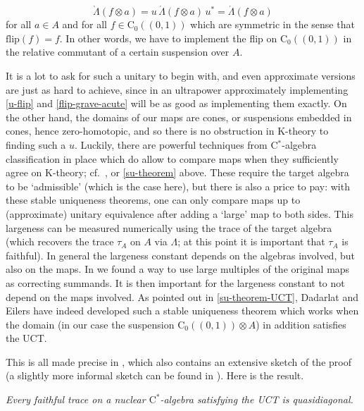 \documentclass{amsart}
\newcounter{number}[section]
\newenvironment{nummer}{\refstepcounter{number}{\noindent\arabic{section}.\arabic{number}}}{}
\newcommand{\bn}{\noindent \begin{nummer} \rm}
\newcommand{\en}{\end{nummer}}
\newenvironment{ntheorem}{\noindent {\sc Theorem:} \it}{}
\begin{document}
 \begin{equation}
 \label{flip-grave-acute}
\grave{\Lambda}(f \otimes a) = u\, \acute{\Lambda}(f  \otimes a) \,u^* = \acute{\Lambda}(f  \otimes a)
\end{equation} 
for all $a \in A$ and for all $f \in \mathrm{C}_0((0,1))$ which are symmetric in the sense that $\mathrm{flip}(f) = f$. In other words, we have to implement the flip on $\mathrm{C}_0((0,1))$ in the relative commutant of a certain suspension over $A$.

It is a lot to ask for such a unitary to begin with, and even approximate versions are just as  hard to achieve, since in an ultrapower approximately implementing \eqref{u-flip} and \eqref{flip-grave-acute} will be as good as implementing them exactly. On the other hand, the domains of our maps are cones, or suspensions embedded in cones, hence zero-homotopic, and so there is no obstruction in $\mathrm{K}$-theory to finding such a $u$. Luckily, there are powerful techniques from C$^*$-algebra classification in place which do allow to compare maps when they sufficiently agree on $\mathrm{K}$-theory; cf.\ \cite{Lin:stableJOT, DE:PLMS}, or \ref{su-theorem} above. These require the target algebra to be `admissible' (which is the case here), but there is also a price to pay: with these stable uniqueness theorems, one can only compare maps up to (approximate) unitary equivalence after adding a `large' map to both sides. This largeness can be measured numerically using the trace of the target algebra (which recovers the trace $\tau_A$ on $A$ via $\Lambda$; at this point it is important that $\tau_A$ is faithful). In general the largeness constant depends on the algebras involved, but also on the maps. In \cite{TWW} we found a way to use large multiples of the original maps as correcting summands. It is then important for the largeness constant to not depend on the maps involved. As pointed out in \ref{su-theorem-UCT}, Dadarlat and Eilers have indeed developed such a stable uniqueness theorem which works when the domain (in our case the suspension $\mathrm{C}_0((0,1)) \otimes A$) in addition satisfies the UCT. 
 
 This is all made precise in \cite{TWW}, which also contains an extensive sketch of the proof (a slightly more informal sketch can be found in \cite{Win:Abel}). Here is the result.
 \en
 
 \bn
 \begin{ntheorem}
 \label{TWW-theorem}
 Every faithful trace on a nuclear $\mathrm{C}^*$-algebra satisfying the UCT is quasidiagonal.
\end{ntheorem}
 
\end{document}
